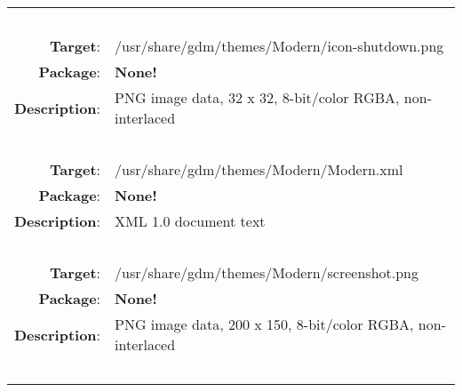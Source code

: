 \begin{longtable}{rl}
\multicolumn{2}{l}{\ }\\
\textbf{Target}: & /usr/share/gdm/themes/Modern/icon-shutdown.png\\
\textbf{Package}: & \textbf{None!}\\
\textbf{Description}: & PNG image data, 32 x 32, 8-bit/color RGBA, non-interlaced\\
\multicolumn{2}{l}{\ }\\
\textbf{Target}: & /usr/share/gdm/themes/Modern/Modern.xml\\
\textbf{Package}: & \textbf{None!}\\
\textbf{Description}: & XML 1.0 document text\\
\multicolumn{2}{l}{\ }\\
\textbf{Target}: & /usr/share/gdm/themes/Modern/screenshot.png\\
\textbf{Package}: & \textbf{None!}\\
\textbf{Description}: & PNG image data, 200 x 150, 8-bit/color RGBA, non-interlaced\\
\multicolumn{2}{l}{\ }\\
\hline
\end{longtable}
